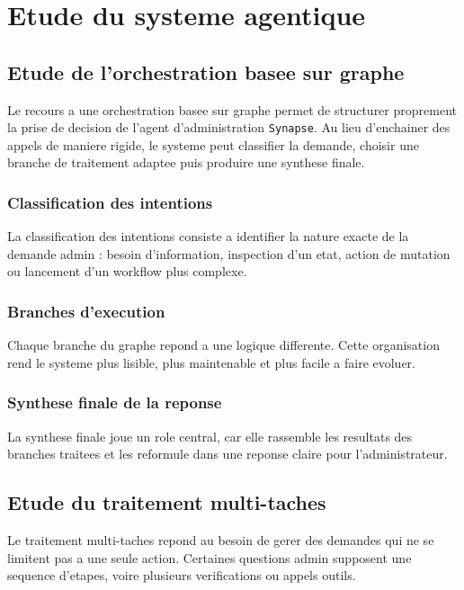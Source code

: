 \section{Etude du systeme agentique}

\subsection{Etude de l'orchestration basee sur graphe}

Le recours a une orchestration basee sur graphe permet de structurer proprement la prise de decision de l'agent d'administration \texttt{Synapse}. Au lieu d'enchainer des appels de maniere rigide, le systeme peut classifier la demande, choisir une branche de traitement adaptee puis produire une synthese finale.

\subsubsection{Classification des intentions}

La classification des intentions consiste a identifier la nature exacte de la demande admin : besoin d'information, inspection d'un etat, action de mutation ou lancement d'un workflow plus complexe.

\subsubsection{Branches d'execution}

Chaque branche du graphe repond a une logique differente. Cette organisation rend le systeme plus lisible, plus maintenable et plus facile a faire evoluer.

\subsubsection{Synthese finale de la reponse}

La synthese finale joue un role central, car elle rassemble les resultats des branches traitees et les reformule dans une reponse claire pour l'administrateur.

\subsection{Etude du traitement multi-taches}

Le traitement multi-taches repond au besoin de gerer des demandes qui ne se limitent pas a une seule action. Certaines questions admin supposent une sequence d'etapes, voire plusieurs verifications ou appels outils.

